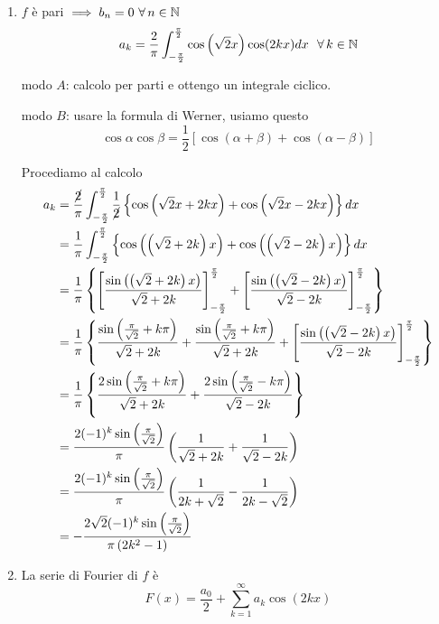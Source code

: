 \begin{enumerate}
\item $f$ è pari $\implies b_{n} =0\ \forall n\in \NN $\begin{equation*}
a_{k} =\frac{2}{\pi }\int ^{\frac{\pi }{2}}_{-\frac{\pi }{2}}\cos\left(\sqrt{2} x\right)\cos( 2kx) dx\ \ \forall k\in \NN 
\end{equation*}

modo $A$: calcolo per parti e ottengo un integrale ciclico.

modo $B$: usare la formula di Werner, usiamo questo\begin{equation*}
\cos \alpha \cos \beta =\frac{1}{2}[\cos( \alpha +\beta ) +\cos( \alpha -\beta )]
\end{equation*}

Procediamo al calcolo\begin{align*}
a_{k} & =\frac{\cancel{2}}{\pi }\int ^{\frac{\pi }{2}}_{-\frac{\pi }{2}}\frac{1}{\cancel{2}}\left\{\cos\left(\sqrt{2} x+2kx\right) +\cos\left(\sqrt{2} x-2kx\right)\right\} dx\\
 & =\frac{1}{\pi }\int ^{\frac{\pi }{2}}_{-\frac{\pi }{2}}\left\{\cos\left(\left(\sqrt{2} +2k\right) x\right) +\cos\left(\left(\sqrt{2} -2k\right) x\right)\right\} dx\\
 & =\frac{1}{\pi }\left\{\left[\frac{\sin\left(\left(\sqrt{2} +2k\right) x\right)}{\sqrt{2} +2k}\right]^{\frac{\pi }{2}}_{-\frac{\pi }{2}} +\left[\frac{\sin\left(\left(\sqrt{2} -2k\right) x\right)}{\sqrt{2} -2k}\right]^{\frac{\pi }{2}}_{-\frac{\pi }{2}}\right\}\\
 & =\frac{1}{\pi }\left\{\frac{\sin\left(\frac{\pi }{\sqrt{2}} +k\pi \right)}{\sqrt{2} +2k} +\frac{\sin\left(\frac{\pi }{\sqrt{2}} +k\pi \right)}{\sqrt{2} +2k} +\left[\frac{\sin\left(\left(\sqrt{2} -2k\right) x\right)}{\sqrt{2} -2k}\right]^{\frac{\pi }{2}}_{-\frac{\pi }{2}}\right\}\\
 & =\frac{1}{\pi }\left\{\frac{2\sin\left(\frac{\pi }{\sqrt{2}} +k\pi \right)}{\sqrt{2} +2k} +\frac{2\sin\left(\frac{\pi }{\sqrt{2}} -k\pi \right)}{\sqrt{2} -2k}\right\}\\
 & =\frac{2( -1)^{k}\sin\left(\frac{\pi }{\sqrt{2}}\right)}{\pi }\left(\frac{1}{\sqrt{2} +2k} +\frac{1}{\sqrt{2} -2k}\right)\\
 & =\frac{2( -1)^{k}\sin\left(\frac{\pi }{\sqrt{2}}\right)}{\pi }\left(\frac{1}{2k+\sqrt{2}} -\frac{1}{2k-\sqrt{2}}\right)\\
 & =-\frac{2\sqrt{2}( -1)^{k}\sin\left(\frac{\pi }{\sqrt{2}}\right)}{\pi \left( 2k^{2} -1\right)}
\end{align*}
\item La serie di Fourier di $f$ è\begin{equation*}
F( x) =\frac{a_{0}}{2} +\sum\limits ^{\infty }_{k=1} a_{k}\cos( 2kx)
\end{equation*}


\end{enumerate}
